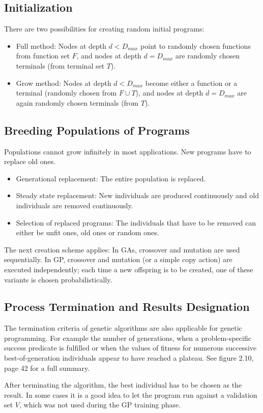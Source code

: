 \documentclass[12pt]{book}
\begin{document}
\subsection{Initialization}
There are two possibilities for creating random initial programs:
\begin{itemize}
\item Full method: Nodes at depth $d < D_{max}$ point to randomly chosen functions from function set $F$, and nodes at depth $d = D_{max}$ are randomly chosen terminals (from terminal set $T$).
\item Grow method: Nodes at depth $d < D_{max}$ become either a function or a terminal (randomly chosen from $F \cup T$), and nodes at depth $d = D_{max}$ are again randomly chosen terminals (from $T$).
\end{itemize}
\subsection{Breeding Populations of Programs}
Populations cannot grow infinitely in most applications. New programs have to replace old ones.
\begin{itemize}
\item Generational replacement: The entire population is replaced.
\item Steady state replacement: New individuals are produced continuously and old individuals are removed continuously.
\item Selection of replaced programs: The individuals that have to be removed can either be unfit ones, old ones or random ones.
\end{itemize}
The next creation scheme applies: In GAs, crossover and mutation are used sequentially. In GP, crossover and mutation (or a simple copy action) are executed independently; each time a new offspring is to be created, one of these variants is chosen probabilistically.
\subsection{Process Termination and Results Designation}
\label{sec:2.3.4}
The termination criteria of genetic algorithms are also applicable for genetic programming. For example the number of generations, when a problem-specific success predicate is fulfilled or when the values of fitness for numerous successive best-of-generation individuals appear to have reached a plateau. See figure 2.10, page 42 for a full summary.

After terminating the algorithm, the best individual has to be chosen as the result. In some cases it is a good idea to let the program run against a validation set $V$, which was not used during the GP training phase.
\end{document}
